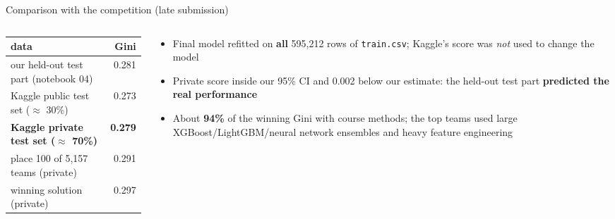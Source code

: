 \documentclass[aspectratio=169,11pt]{beamer}
\newcommand{\feat}[1]{\texttt{\small #1}}   %
\newcommand{\hl}[1]{\textcolor{accent}{\textbf{#1}}}
\begin{document}
\begin{frame}{Comparison with the competition (late submission)}
  \begin{columns}[c]
    \begin{column}{0.5\textwidth}
      \centering\small
      \begin{tabular}{lr}
        \toprule
        data & Gini \\
        \midrule
        our held-out test part (notebook 04) & 0.281 \\
        Kaggle public test set ($\approx$ 30\%) & 0.273 \\
        \textbf{Kaggle private test set ($\approx$ 70\%)} & \hl{0.279} \\
        \midrule
        place 100 of 5,157 teams (private) & 0.291 \\
        winning solution (private) & 0.297 \\
        \bottomrule
      \end{tabular}
    \end{column}
    \begin{column}{0.47\textwidth}
      \small
      \begin{itemize}
        \item Final model refitted on \hl{all} 595,212 rows of \feat{train.csv}; Kaggle's score was \emph{not}
              used to change the model
        \item Private score inside our 95\% CI and 0.002 below our estimate: the held-out test part
              \hl{predicted the real performance}
        \item About \hl{94\%} of the winning Gini with course methods; the top teams used large
              XGBoost/LightGBM/neural network ensembles and heavy feature engineering
      \end{itemize}
    \end{column}
  \end{columns}
\end{frame}
\end{document}
